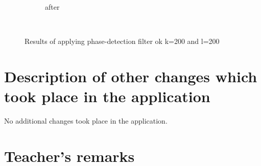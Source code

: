 \documentclass[12pt]{article}
\begin{document}
\begin{figure}[H]
\begin{subfigure}[t]{\subfiguresize}
        \caption{after}
    \end{subfigure}\\[1em]
    \caption{Results of applying phase-detection filter ok k=200 and l=200}
\end{figure}  
\section{Description of other changes which took place in the application}

No additional changes took place in the application.

\vfill
\section*{Teacher's remarks}
\begin{tabularx}{\textwidth}{|X|}
    \hline
    \vspace{7cm}
    \phantom{.} \\
    \hline
\end{tabularx}
\end{document}
